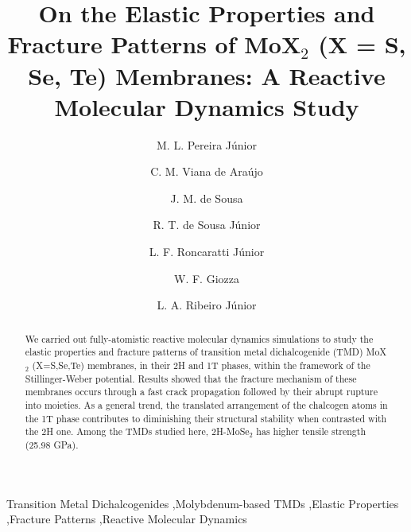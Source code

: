 \documentclass[a4paper,fleqn]{cas-sc}
\begin{document}

\let\WriteBookmarks\relax
\def\floatpagepagefraction{1}
\def\textpagefraction{.001}

\title [mode = title]{On the Elastic Properties and Fracture Patterns of \texorpdfstring{MoX$_2$}{} (X = S, Se, Te) Membranes: A Reactive Molecular Dynamics Study}

\author[1]{M. L. Pereira J\'unior}
\author[1]{C. M. Viana de Ara\'ujo}
\author[2]{J. M. de Sousa}
\author[3]{R. T. de Sousa J\'unior}
\author[1]{L. F. Roncaratti J\'unior}
\author[3]{W. F. Giozza}
\author[1]{L. A. Ribeiro J\'unior}
\cormark[1]

\address[1]{Institute of Physics, University of Bras\'ilia, Bras\'ilia, 70910-900, Brazil.}

\address[2]{Federal Institute of Education, Science and Technology of Piau\'i, S\~ao Raimundo Nonato, Piau\'i, Brazil.}

\address[3]{Department of Electrical Engineering, University of Bras\'{i}lia 70919-970, Brazil.}


\begin{abstract}
We carried out fully-atomistic reactive molecular dynamics simulations to study the elastic properties and fracture patterns of transition metal dichalcogenide (TMD) MoX$_{2}$ (X=S,Se,Te) membranes, in their 2H and 1T phases, within the framework of the Stillinger-Weber potential. Results showed that the fracture mechanism of these membranes occurs through a fast crack propagation followed by their abrupt rupture into moieties. As a general trend, the translated arrangement of the chalcogen atoms in the 1T phase contributes to diminishing their structural stability when contrasted with the 2H one. Among the TMDs studied here, 2H-MoSe$_{2}$ has higher tensile strength (25.98 GPa). 
\end{abstract}

\begin{keywords}
Transition Metal Dichalcogenides \sep Molybdenum-based TMDs \sep Elastic Properties \sep Fracture Patterns \sep Reactive Molecular Dynamics
\end{keywords}

\maketitle
\doublespacing
\end{document}
